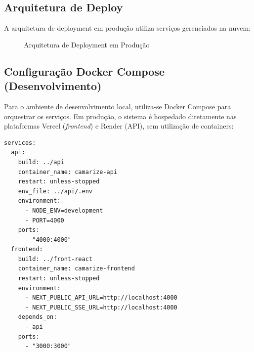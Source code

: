 \documentclass[11pt,a4paper]{article}
\begin{document}
\subsection{Arquitetura de Deploy}
A arquitetura de deployment em produção utiliza serviços gerenciados na nuvem:
\begin{figure}[H]
\centering
{}
\caption{Arquitetura de Deployment em Produção}
\label{fig:deployment}
\end{figure}

\subsection{Configuração Docker Compose (Desenvolvimento)}
Para o ambiente de desenvolvimento local, utiliza-se Docker Compose para orquestrar os serviços. Em produção, o sistema é hospedado diretamente nas plataformas Vercel (\textit{frontend}) e Render (API), sem utilização de containers:
\begin{verbatim}
services:
  api:
    build: ../api
    container_name: camarize-api
    restart: unless-stopped
    env_file: ../api/.env
    environment:
      - NODE_ENV=development
      - PORT=4000
    ports:
      - "4000:4000"
  frontend:
    build: ../front-react
    container_name: camarize-frontend
    restart: unless-stopped
    environment:
      - NEXT_PUBLIC_API_URL=http://localhost:4000
      - NEXT_PUBLIC_SSE_URL=http://localhost:4000
    depends_on:
      - api
    ports:
      - "3000:3000"
\end{verbatim}
\end{document}
